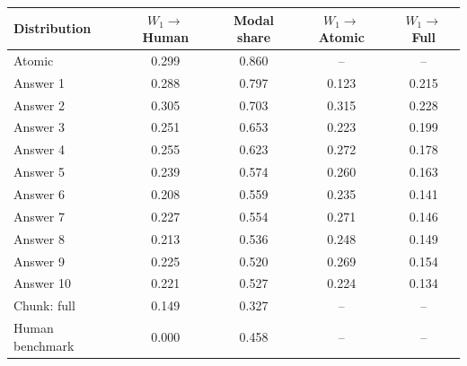 \normalsize
\setlength{\tabcolsep}{3pt}
\begin{tabular}{lcccc}
\toprule
Distribution & $W_1\!\to$ Human & Modal share & $W_1\!\to$ Atomic & $W_1\!\to$ Full \\
\midrule
Atomic & 0.299 & 0.860 & -- & -- \\
Answer 1 & 0.288 & 0.797 & 0.123 & 0.215 \\
Answer 2 & 0.305 & 0.703 & 0.315 & 0.228 \\
Answer 3 & 0.251 & 0.653 & 0.223 & 0.199 \\
Answer 4 & 0.255 & 0.623 & 0.272 & 0.178 \\
Answer 5 & 0.239 & 0.574 & 0.260 & 0.163 \\
Answer 6 & 0.208 & 0.559 & 0.235 & 0.141 \\
Answer 7 & 0.227 & 0.554 & 0.271 & 0.146 \\
Answer 8 & 0.213 & 0.536 & 0.248 & 0.149 \\
Answer 9 & 0.225 & 0.520 & 0.269 & 0.154 \\
Answer 10 & 0.221 & 0.527 & 0.224 & 0.134 \\
Chunk: full & 0.149 & 0.327 & -- & -- \\
Human benchmark & 0.000 & 0.458 & -- & -- \\
\bottomrule
\end{tabular}
